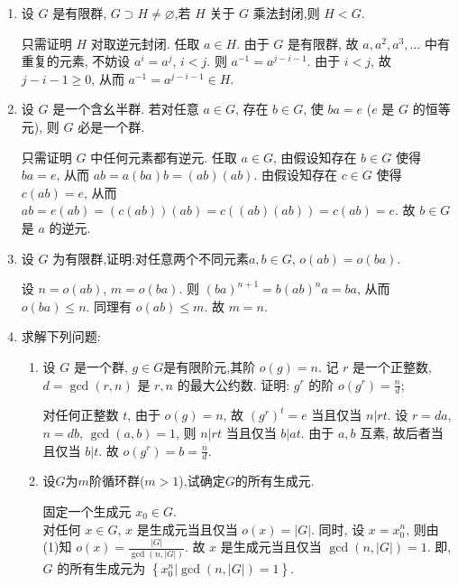 \begin{enumerate}
\item 设 $G$ 是有限群, $G \supset H \neq \varnothing$,若 $H$ 关于 $G$ 乘法封闭,则 $H<G$.
\begin{solution}
    只需证明 $H$ 对取逆元封闭.
    任取 $a\in H$.
    由于 $G$ 是有限群,
    故 $a,a^2,a^3,\dots$ 中有重复的元素,
    不妨设 $a^i=a^j$, $i<j$.
    则 $a^{-1}=a^{j-i-1}$.
    由于 $i<j$, 故 $j-i-1\geqslant 0$,
    从而 $a^{-1}=a^{j-i-1}\in H$. 
\end{solution}

\item 设 $G$ 是一个含幺半群.
若对任意 $a \in G$, 存在 $b \in G$,
使 $ba=e$ ($e$ 是 $G$ 的恒等元), 则 $G$ 必是一个群.
\begin{solution}
    只需证明 $G$ 中任何元素都有逆元.
    任取 $a\in G$,
    由假设知存在 $b\in G$ 使得 $ba=e$,
    从而 $ab=a(ba)b=(ab)(ab)$.
    由假设知存在 $c\in G$ 使得 $c(ab)=e$,
    从而 $ab=e(ab)=(c(ab))(ab)=c((ab)(ab))=c(ab)=e$.
    故 $b\in G$ 是 $a$ 的逆元. 
\end{solution}

\item 设 $G$ 为有限群,证明:对任意两个不同元素$a,b \in G$, $o(ab)=o(ba)$.
\begin{solution}
    设 $n=o(ab)$, $m=o(ba)$.
    则 $(ba)^{n+1}=b(ab)^na=ba$,
    从而 $o(ba)\leqslant n$.
    同理有 $o(ab)\leqslant m$.
    故 $m=n$. 
\end{solution}

\item 求解下列问题: 
\begin{enumerate}
\item[(1)] 设 $G$ 是一个群, $g \in G$是有限阶元,其阶 $o(g)=n$.
记 $r$ 是一个正整数, $d=\gcd(r,n)$ 是 $r,n$ 的最大公约数.
证明: $g^r$ 的阶 $o(g^r)=\frac{n}{d}$;
\begin{solution}
    对任何正整数 $t$,
    由于 $o(g)=n$,
    故 $\left(g^r\right)^t=e$ 当且仅当 $n|rt$.
    设 $r=da$, $n=db$, $\gcd(a,b)=1$,
    则 $n|rt$ 当且仅当 $b|at$.
    由于 $a,b$ 互素,
    故后者当且仅当 $b|t$.
    故 $o(g^r)=b=\frac{n}{d}$. 
\end{solution}
\item[(2)] 设$G$为$m$阶循环群($m>1$),试确定$G$的所有生成元.
\begin{solution}
    固定一个生成元 $x_0\in G$. \\
    对任何 $x\in G$,
    $x$ 是生成元当且仅当 $o(x)=|G|$.
    同时, 设 $x=x_0^n$,
    则由(1)知 $o(x)=\frac{|G|}{\gcd(n,|G|)}$.
    故 $x$ 是生成元当且仅当 $\gcd(n,|G|)=1$.
    即, $G$ 的所有生成元为 $\left\{x_0^n|\gcd(n,|G|)=1\right\}$. 
\end{solution}
\end{enumerate}


\end{enumerate}
